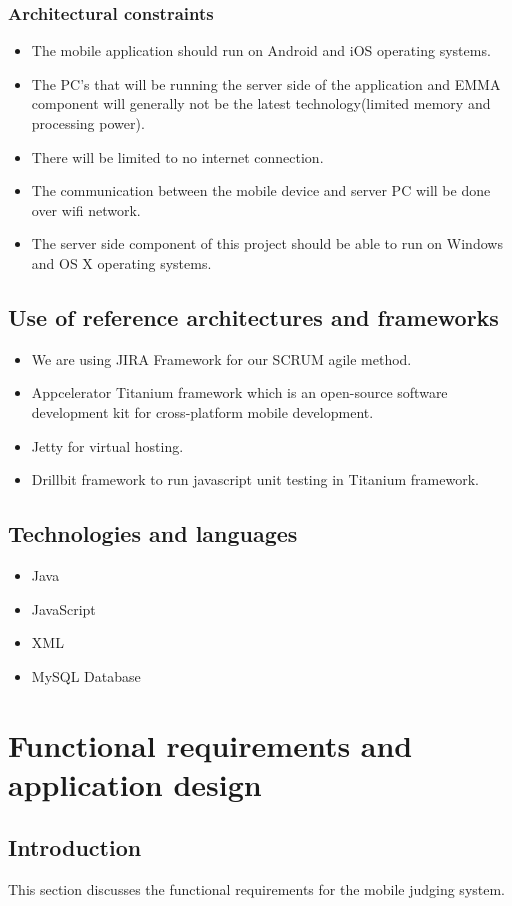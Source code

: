\documentclass[10pt,a4paper]{article}
\begin{document}
\subsubsection{Architectural constraints}
\begin{itemize}
\item The mobile application should run on Android and iOS operating systems.
\item The PC's that will be running the server side of the application and EMMA component will generally not be the latest technology(limited memory and processing power).
\item There will be limited to no internet connection.
\item The communication between the mobile device and server PC will be done over wifi network.
\item The server side component of this project should be able to run on Windows and OS X operating systems.
\end{itemize}
\subsection{Use of reference architectures and frameworks}
\begin{itemize}
\item We are using JIRA Framework for our SCRUM agile method.
\item Appcelerator Titanium framework which is an open-source software development kit for cross-platform mobile development.
\item Jetty for virtual hosting.
\item Drillbit framework to run javascript unit  testing in Titanium framework.
\end{itemize}
\subsection{Technologies and languages}
\begin{itemize}
\item Java
\item JavaScript
\item XML
\item MySQL Database
\end{itemize}
\section{Functional requirements and application design}
\subsection{Introduction}
This section discusses the functional requirements for the mobile judging system.
\end{document}
